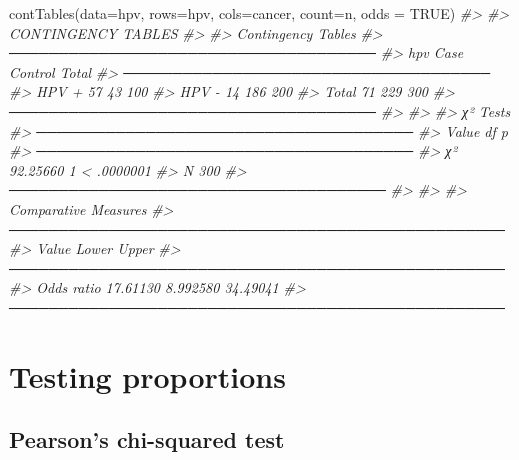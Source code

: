 \documentclass[
]{memoir}
\newenvironment{Shaded}{\begin{snugshade}}{\end{snugshade}}
\newcommand{\AttributeTok}[1]{\textcolor[rgb]{0.77,0.63,0.00}{#1}}
\newcommand{\CommentTok}[1]{\textcolor[rgb]{0.56,0.35,0.01}{\textit{#1}}}
\newcommand{\ConstantTok}[1]{\textcolor[rgb]{0.00,0.00,0.00}{#1}}
\newcommand{\FunctionTok}[1]{\textcolor[rgb]{0.00,0.00,0.00}{#1}}
\newcommand{\NormalTok}[1]{#1}
\begin{document}
\begin{Shaded}
\begin{Highlighting}[]
\FunctionTok{contTables}\NormalTok{(}\AttributeTok{data=}\NormalTok{hpv, }\AttributeTok{rows=}\NormalTok{hpv, }\AttributeTok{cols=}\NormalTok{cancer, }\AttributeTok{count=}\NormalTok{n, }\AttributeTok{odds =} \ConstantTok{TRUE}\NormalTok{)}
\CommentTok{\#\textgreater{} }
\CommentTok{\#\textgreater{}  CONTINGENCY TABLES}
\CommentTok{\#\textgreater{} }
\CommentTok{\#\textgreater{}  Contingency Tables                    }
\CommentTok{\#\textgreater{}  ───────────────────────────────────── }
\CommentTok{\#\textgreater{}    hpv      Case    Control    Total   }
\CommentTok{\#\textgreater{}  ───────────────────────────────────── }
\CommentTok{\#\textgreater{}    HPV +      57         43      100   }
\CommentTok{\#\textgreater{}    HPV {-}      14        186      200   }
\CommentTok{\#\textgreater{}    Total      71        229      300   }
\CommentTok{\#\textgreater{}  ───────────────────────────────────── }
\CommentTok{\#\textgreater{} }
\CommentTok{\#\textgreater{} }
\CommentTok{\#\textgreater{}  χ² Tests                               }
\CommentTok{\#\textgreater{}  ────────────────────────────────────── }
\CommentTok{\#\textgreater{}          Value       df    p            }
\CommentTok{\#\textgreater{}  ────────────────────────────────────── }
\CommentTok{\#\textgreater{}    χ²    92.25660     1    \textless{} .0000001   }
\CommentTok{\#\textgreater{}    N          300                       }
\CommentTok{\#\textgreater{}  ────────────────────────────────────── }
\CommentTok{\#\textgreater{} }
\CommentTok{\#\textgreater{} }
\CommentTok{\#\textgreater{}  Comparative Measures                               }
\CommentTok{\#\textgreater{}  ────────────────────────────────────────────────── }
\CommentTok{\#\textgreater{}                  Value       Lower       Upper      }
\CommentTok{\#\textgreater{}  ────────────────────────────────────────────────── }
\CommentTok{\#\textgreater{}    Odds ratio    17.61130    8.992580    34.49041   }
\CommentTok{\#\textgreater{}  ──────────────────────────────────────────────────}
\end{Highlighting}
\end{Shaded}

\hypertarget{testing-proportions}{%
\chapter{Testing proportions}\label{testing-proportions}}

\hypertarget{pearsons-chi-squared-test}{%
\section{Pearson's chi-squared test}\label{pearsons-chi-squared-test}}
\end{document}
